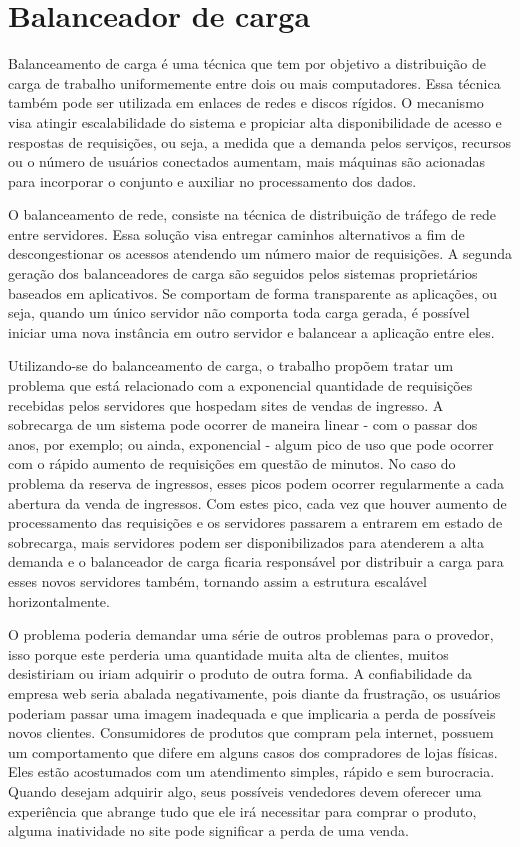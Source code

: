 \chapter{Balanceador de carga}

Balanceamento de carga é uma técnica que tem por objetivo a distribuição de carga de trabalho uniformemente entre dois ou
mais computadores. Essa técnica também pode ser utilizada em enlaces de redes e discos rígidos. O mecanismo visa atingir
escalabilidade do sistema e propiciar alta disponibilidade de acesso e respostas de requisições, ou seja, a medida que a
demanda pelos serviços, recursos ou o número de usuários conectados aumentam, mais máquinas são acionadas para incorporar
o conjunto e auxiliar no processamento dos dados.


O balanceamento de rede, consiste na técnica de distribuição de tráfego de rede entre servidores. Essa solução visa entregar
caminhos alternativos a fim de descongestionar os acessos atendendo um número maior de requisições. A segunda geração dos
balanceadores de carga são seguidos pelos sistemas proprietários baseados em aplicativos. Se comportam de forma transparente
as aplicações, ou seja, quando um único servidor não comporta toda carga gerada, é possível iniciar uma nova instância em
outro servidor e balancear a aplicação entre eles.


Utilizando-se do balanceamento de carga, o trabalho propõem tratar um problema que está relacionado com a exponencial
quantidade de requisições recebidas pelos servidores que hospedam sites de vendas de ingresso. A sobrecarga de um
sistema pode ocorrer de maneira linear - com o passar dos anos, por exemplo; ou ainda, exponencial - algum pico de uso
que pode ocorrer com o rápido aumento de requisições em questão de minutos.
No caso do problema da reserva de ingressos, esses picos podem ocorrer regularmente a cada abertura da venda de ingressos.
Com estes pico, cada vez que houver aumento de processamento das requisições e os servidores passarem a entrarem em
estado de sobrecarga, mais servidores podem ser disponibilizados para atenderem a alta demanda e o balanceador de carga
ficaria responsável por distribuir a carga para esses novos servidores também, tornando assim a estrutura escalável
horizontalmente.

O problema poderia demandar uma série de outros problemas para o provedor, isso porque este perderia uma quantidade muita
alta de clientes, muitos desistiriam ou iriam adquirir o produto de outra forma. A confiabilidade da empresa web seria
abalada negativamente, pois diante da frustração, os usuários poderiam passar uma imagem inadequada e que implicaria a perda
de possíveis novos clientes. Consumidores de produtos que compram pela internet, possuem um comportamento que difere em
alguns casos dos compradores de lojas físicas. Eles estão acostumados com um atendimento simples, rápido e sem burocracia.
Quando desejam adquirir algo, seus possíveis vendedores devem oferecer uma experiência que abrange tudo que ele irá
necessitar para comprar o produto, alguma inatividade no site pode significar a perda de uma venda.


